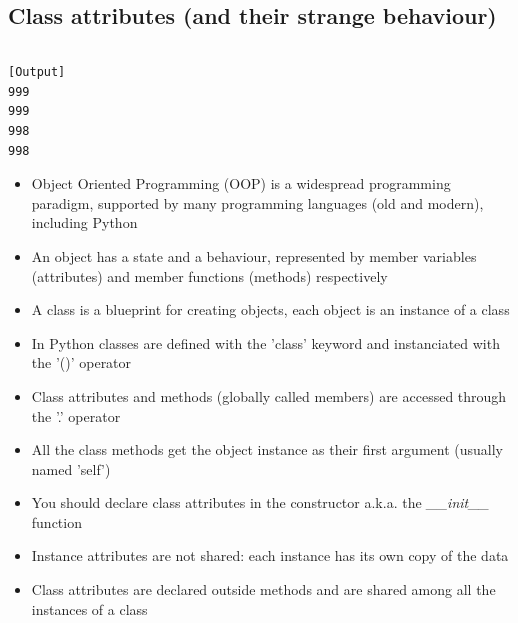 
\subsection{Class attributes (and their strange behaviour)}


\inputminted{python}{snippets/class_attributes_3.py}

\begin{verbatim}
[Output]
999
999
998
998
\end{verbatim}

\hfill
\vfill

\begin{tcolorbox}[width=\textwidth,colback={white},title={Ricapitolando: },colbacktitle=cyan,coltitle=black]
  \begin{itemize}
    \footnotesize
    \item Object Oriented Programming (OOP) is a widespread programming paradigm,
          supported by many programming languages (old and modern), including Python
    \medskip
    \item An object has a state and a behaviour, represented by member variables (attributes)
          and member functions (methods) respectively
    \medskip
    \item A class is a blueprint for creating objects, each object is an instance of a class
    \medskip
    \item In Python classes are defined with the 'class' keyword and instanciated with the '()' operator
    \medskip
    \item Class attributes and methods (globally called members) are accessed through the '.' operator
    \medskip
    \item All the class methods get the object instance as their first argument (usually named 'self')
    \medskip
    \item You should declare class attributes in the constructor a.k.a. the \emph{\_\_init\_\_} function
    \medskip
    \item Instance attributes are not shared: each instance has its own copy of the data
    \medskip
    \item Class attributes are declared outside methods and are shared among all the instances of a class
  \end{itemize} 
\end{tcolorbox}

\newpage


